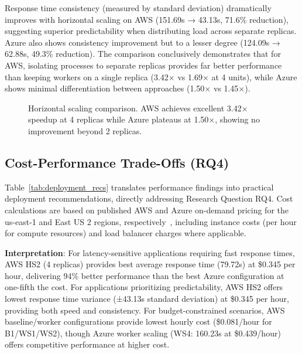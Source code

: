 Response time consistency (measured by standard deviation) dramatically improves with horizontal scaling on AWS (151.69s → 43.13s, 71.6\% reduction), suggesting superior predictability when distributing load across separate replicas. Azure also shows consistency improvement but to a lesser degree (124.09s → 62.88s, 49.3\% reduction). The comparison conclusively demonstrates that for AWS, isolating processes to separate replicas provides far better performance than keeping workers on a single replica (3.42× vs 1.69× at 4 units), while Azure shows minimal differentiation between approaches (1.50× vs 1.45×).



\begin{figure}[!htbp]
\centering
{}
\caption{Horizontal scaling comparison. AWS achieves excellent 3.42× speedup at 4 replicas while Azure plateaus at 1.50×, showing no improvement beyond 2 replicas.}
\label{fig:horizontal_4}
\end{figure}

\subsection{Cost-Performance Trade-Offs (RQ4)}

Table~\ref{tab:deployment_recs} translates performance findings into practical deployment recommendations, directly addressing Research Question RQ4. Cost calculations are based on published AWS and Azure on-demand pricing for the us-east-1 and East US 2 regions, respectively~\cite{aws2023fargate_pricing, aws2023elb_pricing, aws2023ecr_pricing, azure2023containerapps_pricing, azure2023acr_pricing}, including instance costs (per hour for compute resources) and load balancer charges where applicable.

\textbf{Interpretation}: For latency-sensitive applications requiring fast response times, AWS HS2 (4 replicas) provides best average response time (79.72s) at \$0.345 per hour, delivering 94\% better performance than the best Azure configuration at one-fifth the cost. For applications prioritizing predictability, AWS HS2 offers lowest response time variance (±43.13s standard deviation) at \$0.345 per hour, providing both speed and consistency. For budget-constrained scenarios, AWS baseline/worker configurations provide lowest hourly cost (\$0.081/hour for B1/WS1/WS2), though Azure worker scaling (WS4: 160.23s at \$0.439/hour) offers competitive performance at higher cost.


